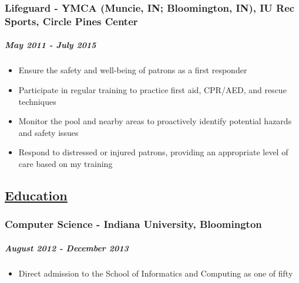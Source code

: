 \documentclass[11pt]{article}
\begin{document}
\subsubsection*{Lifeguard - YMCA (Muncie, IN; Bloomington, IN), IU Rec Sports, Circle Pines Center}
\label{sec:orgf94a9c2}
\subparagraph*{\emph{May 2011 - July 2015}}
\label{sec:orgc93f234}
\begin{itemize}
\item Ensure the safety and well-being of patrons as a first responder
\item Participate in regular training to practice first aid, CPR/AED, and
rescue techniques
\item Monitor the pool and nearby areas to proactively identify potential
hazards and safety issues
\item Respond to distressed or injured patrons, providing an appropriate
level of care based on my training
\end{itemize}
\subsection*{\underline{Education}}
\label{sec:org6a75280}
\subsubsection*{Computer Science - Indiana University, Bloomington}
\label{sec:orga0b28dc}
\subparagraph*{August 2012 - December 2013}
\label{sec:org30127bf}
\begin{itemize}
\item Direct admission to the School of Informatics and Computing as one of fifty
\end{itemize}
\end{document}
